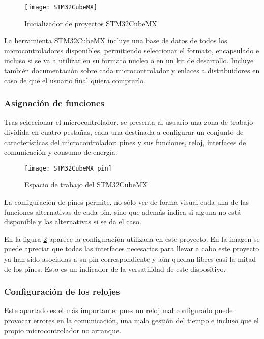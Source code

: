 \begin{figure} [h]
    \centering
    \texttt{[image: STM32CubeMX]}
    \caption{Inicializador de proyectos STM32CubeMX}
    \label{fig:STM32CubeMX}
\end{figure}

La herramienta STM32CubeMX incluye una base de datos de todos los microcontroladores disponibles, permitiendo seleccionar el formato, encapsulado e incluso si se va a utilizar en su formato nucleo o en un kit de desarrollo. Incluye también documentación sobre cada microcontrolador y enlaces a distribuidores en caso de que el usuario final quiera comprarlo. 

\subsubsection{Asignación de funciones\label{Configuracion_micro_asignacion}}

Tras seleccionar el microcontrolador, se presenta al usuario una zona de trabajo dividida en cuatro pestañas, cada una destinada a configurar un conjunto de características del microcontrolador: pines y sus funciones, reloj, interfaces de comunicación y consumo de energía.

\begin{figure} [h]
    \centering
    \texttt{[image: STM32CubeMX\_pin]}
    \caption{Espacio de trabajo del STM32CubeMX}
    \label{fig:STM32CubeMX_pin}
\end{figure}

La configuración de pines permite, no sólo ver de forma visual cada una de las funciones alternativas de cada pin, sino que además indica si alguna no está disponible y las alternativas si se da el caso.

En la figura \ref{fig:STM32CubeMX_pin} aparece la configuración utilizada en este proyecto. En la imagen se puede apreciar que todas las interfaces necesarias para llevar a cabo este proyecto ya han sido asociadas a su pin correspondiente y aún quedan libres casi la mitad de los pines. Esto es un indicador de la versatilidad de este dispositivo.

\subsubsection{Configuración de los relojes\label{Configuracion_micro_reloj}}

Este apartado es el más importante, pues un reloj mal configurado puede provocar errores en la comunicación, una mala gestión del tiempo e incluso que el propio microcontrolador no arranque.


